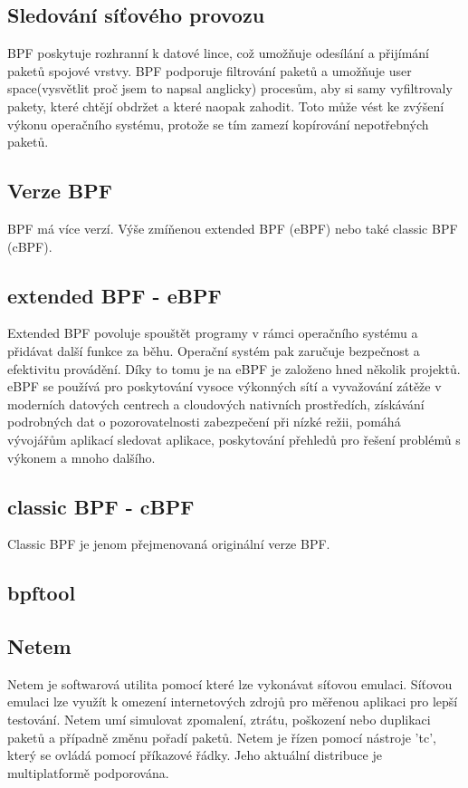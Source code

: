 \subsection*{Sledování síťového provozu}
BPF poskytuje rozhranní k datové lince, což umožňuje odesílání a přijímání paketů spojové vrstvy. BPF podporuje filtrování paketů a umožňuje user space(vysvětlit proč jsem to napsal anglicky) procesům,
aby si samy vyfiltrovaly pakety, které chtějí obdržet a které naopak zahodit. Toto může vést ke zvýšení výkonu operačního systému, protože se tím zamezí kopírování nepotřebných paketů.

\subsection*{Verze BPF}
BPF má více verzí. Výše zmíňenou extended BPF (eBPF) nebo také classic BPF (cBPF).

\subsection*{extended BPF - eBPF}
Extended BPF povoluje spouštět programy v rámci operačního systému a přidávat další funkce za běhu.
Operační systém pak zaručuje bezpečnost a efektivitu provádění. Díky to tomu je na eBPF je založeno hned několik projektů.
eBPF se používá pro  poskytování vysoce výkonných sítí a vyvažování zátěže v moderních datových centrech a cloudových nativních prostředích,
získávání podrobných dat o pozorovatelnosti zabezpečení při nízké režii, pomáhá vývojářům aplikací sledovat aplikace,
poskytování přehledů pro řešení problémů s výkonem a mnoho dalšího.

\subsection*{classic BPF - cBPF}
Classic BPF je jenom přejmenovaná originální verze BPF.

\subsection{bpftool}



\subsection{Netem}
Netem\cite{Netem} je softwarová utilita pomocí které lze vykonávat síťovou emulaci. Síťovou emulaci lze využít k omezení internetových zdrojů
pro měřenou aplikaci pro lepší testování. Netem umí simulovat zpomalení, ztrátu, poškození nebo duplikaci paketů a případně změnu pořadí
paketů. Netem je řízen pomocí nástroje 'tc', který se ovládá pomocí příkazové řádky. Jeho aktuální distribuce je multiplatformě podporována.

